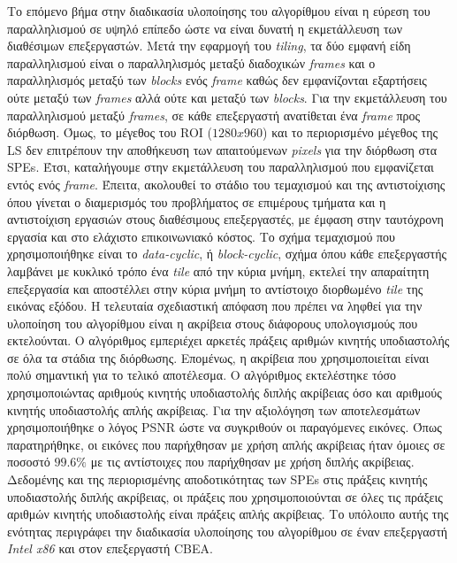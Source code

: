 Το επόμενο βήμα στην διαδικασία υλοποίησης του αλγορίθμου είναι η εύρεση του παραλληλισμού σε υψηλό επίπεδο ώστε να είναι δυνατή η εκμετάλλευση των διαθέσιμων επεξεργαστών. Μετά την εφαρμογή του \textsl{tiling}, τα δύο εμφανή είδη παραλληλισμού είναι ο παραλληλισμός μεταξύ διαδοχικών \textsl{frames} και ο παραλληλισμός μεταξύ των \textsl{blocks} ενός \textsl{frame} καθώς δεν εμφανίζονται εξαρτήσεις ούτε μεταξύ των \textsl{frames} αλλά ούτε και μεταξύ των \textsl{blocks}. Για την εκμετάλλευση του παραλληλισμού μεταξύ \textsl{frames}, σε κάθε επεξεργαστή ανατίθεται ένα \textsl{frame} προς διόρθωση. Όμως, το μέγεθος του \ac{ROI} (\(1280x960\)) και το περιορισμένο μέγεθος της \ac{LS} δεν επιτρέπουν την αποθήκευση των απαιτούμενων \textsl{pixels} για την διόρθωση στα \acp{SPE}. Έτσι, καταλήγουμε στην εκμετάλλευση του παραλληλισμού που εμφανίζεται εντός ενός \textsl{frame}.\newline \indent
Έπειτα, ακολουθεί το στάδιο του τεμαχισμού και της αντιστοίχισης όπου γίνεται ο διαμερισμός του προβλήματος σε επιμέρους τμήματα και η αντιστοίχιση εργασιών στους διαθέσιμους επεξεργαστές, με έμφαση στην ταυτόχρονη εργασία και στο ελάχιστο επικοινωνιακό κόστος. Το σχήμα τεμαχισμού που χρησιμοποιήθηκε είναι το \textsl{data-cyclic}, ή \textsl{block-cyclic}, σχήμα όπου κάθε επεξεργαστής λαμβάνει με κυκλικό τρόπο ένα \textsl{tile} από την κύρια μνήμη, εκτελεί την απαραίτητη επεξεργασία και αποστέλλει στην κύρια μνήμη το αντίστοιχο διορθωμένο \textsl{tile} της εικόνας εξόδου.\newline \indent
Η τελευταία σχεδιαστική απόφαση που πρέπει να ληφθεί για την υλοποίηση του αλγορίθμου είναι η ακρίβεια στους διάφορους υπολογισμούς που εκτελούνται. Ο αλγόριθμος εμπεριέχει αρκετές πράξεις αριθμών κινητής υποδιαστολής σε όλα τα στάδια της διόρθωσης. Επομένως, η ακρίβεια που χρησιμοποιείται είναι πολύ σημαντική για το τελικό αποτέλεσμα. Ο αλγόριθμος εκτελέστηκε τόσο χρησιμοποιώντας αριθμούς κινητής υποδιαστολής διπλής ακρίβειας όσο και αριθμούς κινητής υποδιαστολής απλής ακρίβειας. Για την αξιολόγηση των αποτελεσμάτων χρησιμοποιήθηκε ο λόγος \ac{PSNR} ώστε να συγκριθούν οι παραγόμενες εικόνες. Όπως παρατηρήθηκε, οι εικόνες που παρήχθησαν με χρήση απλής ακρίβειας ήταν όμοιες σε ποσοστό \(99.6\%\) με τις αντίστοιχες που παρήχθησαν με χρήση διπλής ακρίβειας. Δεδομένης και της περιορισμένης αποδοτικότητας των \acp{SPE} στις πράξεις κινητής υποδιαστολής διπλής ακρίβειας, οι πράξεις που χρησιμοποιούνται σε όλες τις πράξεις αριθμών κινητής υποδιαστολής είναι πράξεις απλής ακρίβειας.\newline \indent
Το υπόλοιπο αυτής της ενότητας περιγράφει την διαδικασία υλοποίησης του αλγορίθμου σε έναν επεξεργαστή \textsl{Intel x86} και στον επεξεργαστή \ac{CBEA}.

